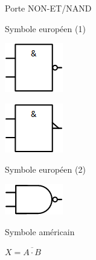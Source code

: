 \documentclass[11pt,a4paper]{article}
\begin{document}
\begin{table}[!ht]
  \centering
  \begin{minipage}{0.70\textwidth}
    \centering

    Porte NON-ET/NAND

    \medskip

    \begin{minipage}{0.50\textwidth}
      \centering
      \begin{center}
      Symbole européen (1)

      \includegraphics[scale=2.00]{img/portes_logiques/2-NAND/LogicGate-NAND_eur1.png}

      \medskip

      \includegraphics[scale=2.00]{img/portes_logiques/2-NAND/LogicGate-NAND_eur2.png}

      Symbole européen (2)
      \end{center}

    \end{minipage}
    \hfillx
    \begin{minipage}{0.50\textwidth}
      \centering

      \begin{center}

      \includegraphics[scale=2.00]{img/portes_logiques/2-NAND/LogicGate-NAND_usa.png}

      Symbole américain
      \end{center}

    \end{minipage}

  \end{minipage}
  \hfillx
  \begin{minipage}{0.30\textwidth}
    \centering

    \begin{center}
    $ X = \overline{A \cdot B} $


\end{center}
\end{minipage}
\end{table}
\end{document}
